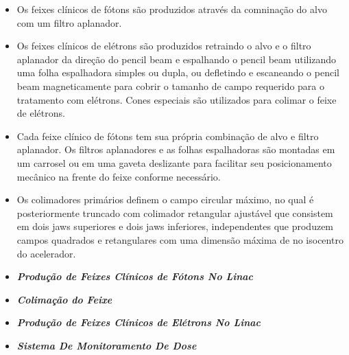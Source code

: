 \documentclass[11pt,a4paper]{article}
\begin{document}
                    \begin{itemize}
                        \item Os feixes clínicos de fótons são produzidos através da comninação do alvo com um filtro aplanador.
                        \item Os feixes clínicos de elétrons são produzidos retraindo o alvo e o filtro aplanador da direção do pencil beam e espalhando o pencil beam utilizando uma folha espalhadora simples ou dupla, ou defletindo e escaneando o pencil beam magneticamente para cobrir o tamanho de campo requerido para o tratamento com elétrons. Cones especiais são utilizados para colimar o feixe de elétrons.
                        \item Cada feixe clínico de fótons tem sua própria combinação de alvo e filtro aplanador. Os filtros aplanadores e as folhas espalhadoras são montadas em um carrosel ou em uma gaveta deslizante para facilitar seu posicionamento mecânico na frente do feixe conforme necessário.
                        \item Os colimadores primários definem o campo circular máximo, no qual é posteriormente truncado com colimador retangular ajustável que consistem em dois jaws superiores e dois jaws inferiores, independentes que produzem campos quadrados e retangulares com uma dimensão máxima de  no isocentro do acelerador.   
                    \end{itemize}
                    
                \begin{itemize}
                    \item \textbf{\textit{\textcolor{CarnationPink}{Produção de Feixes Clínicos de Fótons No Linac}}}
                \end{itemize}

                \begin{itemize}
                    \item \textbf{\textit{\textcolor{CarnationPink}{Colimação do Feixe}}}
                \end{itemize}

                \begin{itemize}
                    \item \textbf{\textit{\textcolor{CarnationPink}{Produção de Feixes Clínicos de Elétrons No Linac}}}
                \end{itemize}


                \begin{itemize}
                    \item \textbf{\textit{\textcolor{CarnationPink}{Sistema De Monitoramento De Dose}}}
                \end{itemize}
                


\end{document}
